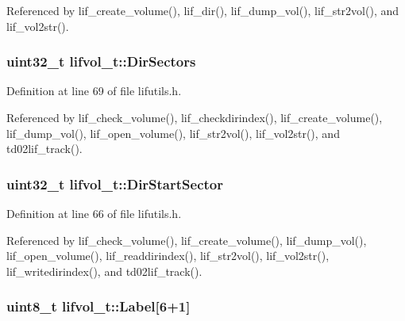 Referenced by lif\+\_\+create\+\_\+volume(), lif\+\_\+dir(), lif\+\_\+dump\+\_\+vol(), lif\+\_\+str2vol(), and lif\+\_\+vol2str().

\subsubsection[{\texorpdfstring{Dir\+Sectors}{DirSectors}}]{\setlength{\rightskip}{0pt plus 5cm}uint32\+\_\+t lifvol\+\_\+t\+::\+Dir\+Sectors}\hypertarget{structlifvol__t_aceac3bc67cda1f79d91c002411e33897}{}\label{structlifvol__t_aceac3bc67cda1f79d91c002411e33897}


Definition at line 69 of file lifutils.\+h.



Referenced by lif\+\_\+check\+\_\+volume(), lif\+\_\+checkdirindex(), lif\+\_\+create\+\_\+volume(), lif\+\_\+dump\+\_\+vol(), lif\+\_\+open\+\_\+volume(), lif\+\_\+str2vol(), lif\+\_\+vol2str(), and td02lif\+\_\+track().

\subsubsection[{\texorpdfstring{Dir\+Start\+Sector}{DirStartSector}}]{\setlength{\rightskip}{0pt plus 5cm}uint32\+\_\+t lifvol\+\_\+t\+::\+Dir\+Start\+Sector}\hypertarget{structlifvol__t_a89b86c990a7843cfa2addfff9a775137}{}\label{structlifvol__t_a89b86c990a7843cfa2addfff9a775137}


Definition at line 66 of file lifutils.\+h.



Referenced by lif\+\_\+check\+\_\+volume(), lif\+\_\+create\+\_\+volume(), lif\+\_\+dump\+\_\+vol(), lif\+\_\+open\+\_\+volume(), lif\+\_\+readdirindex(), lif\+\_\+str2vol(), lif\+\_\+vol2str(), lif\+\_\+writedirindex(), and td02lif\+\_\+track().

\subsubsection[{\texorpdfstring{Label}{Label}}]{\setlength{\rightskip}{0pt plus 5cm}uint8\+\_\+t lifvol\+\_\+t\+::\+Label\mbox{[}6+1\mbox{]}}\hypertarget{structlifvol__t_abbccb2f637812a31d24aa1f6725194be}{}\label{structlifvol__t_abbccb2f637812a31d24aa1f6725194be}


